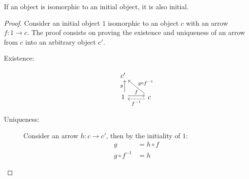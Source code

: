 \begin{theorem}
  If an object is isomorphic to an initial object, it is also initial.

  \begin{proof}
    Consider an initial object $1$ isomorphic to an object $c$ with an arrow
    $f:1\to c$. The proof consists on proving the existence and uniqueness of an
    arrow from $c$ into an arbitrary object $c'$.

    \begin{description}
      \item[Existence:]
        \[\begin{tikzcd}[ampersand replacement=\&]
          {c'} \\
          1 \& c
          \arrow["f", shift left=1, from=2-1, to=2-2]
          \arrow["{f^{-1}}", shift left=1, dashed, from=2-2, to=2-1]
          \arrow["g", shift right=1, from=2-1, to=1-1]
          \arrow["{g\circ f^{-1}}"', from=2-2, to=1-1]
        \end{tikzcd}\]
      \item[Uniqueness:] Consider an arrow $h:c\to c'$, then by the initiality
        of $1$:
        \[
          \begin{aligned}
            g &= h\circ f\\
            g\circ f^{-1} &= h
          \end{aligned}
        \]
    \end{description}
  \end{proof}
\end{theorem}